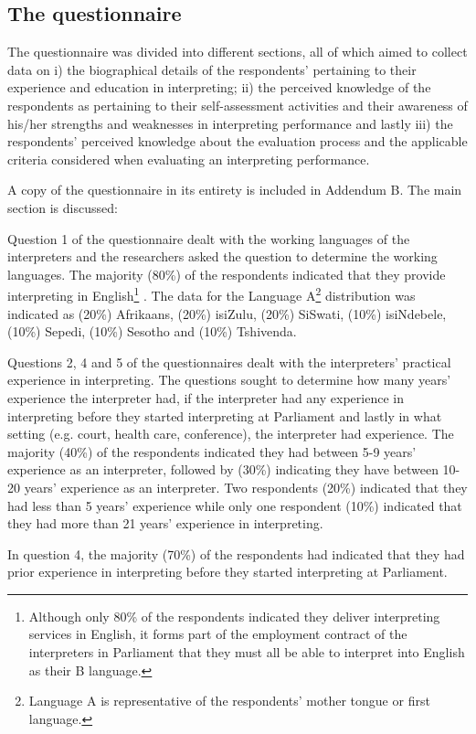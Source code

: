\documentclass[output=paper]{langsci/langscibook}
\begin{document}
\subsection{The questionnaire}
The questionnaire was divided into different sections, all of which aimed to collect data on i) the biographical details of the respondents’ pertaining to their experience and education in interpreting; ii) the perceived knowledge of the respondents as pertaining to their self-assessment activities and their awareness of his/her strengths and weaknesses in interpreting performance and lastly iii) the respondents’ perceived knowledge about  the evaluation process and the applicable criteria considered when evaluating an interpreting performance. 

A copy of the questionnaire in its entirety is included in Addendum B. The main section is discussed:

Question 1 of the questionnaire dealt with the working languages of the interpreters and the researchers asked the question to determine the working languages. The majority (80\%) of the respondents indicated that they provide interpreting in English\footnote{Although only 80\% of the respondents indicated they deliver interpreting services in English, it forms part of the employment contract of the interpreters in Parliament that they must all be able to interpret into English as their B language.} . The data for the Language A\footnote{Language A is representative of the respondents’ mother tongue or first language.}  distribution was indicated as (20\%) Afrikaans, (20\%) isiZulu, (20\%) SiSwati, (10\%) isiNdebele, (10\%) Sepedi, (10\%) Sesotho and (10\%) Tshivenda. 

Questions 2, 4 and 5 of the questionnaires dealt with the interpreters’ practical experience in interpreting. The questions sought to determine how many years’ experience the interpreter had, if the interpreter had any experience in interpreting before they started interpreting at Parliament and lastly in what setting (e.g. court, health care, conference), the interpreter had experience. The majority (40\%) of the respondents indicated they had between 5-9 years’ experience as an interpreter, followed by (30\%) indicating they have between 10-20 years’ experience as an interpreter. Two respondents (20\%) indicated that they had less than 5 years’ experience while only one respondent (10\%) indicated that they had more than 21 years’ experience in interpreting.  

In question 4, the majority (70\%) of the respondents had indicated that they had prior experience in interpreting before they started interpreting at Parliament.  
\end{document}
